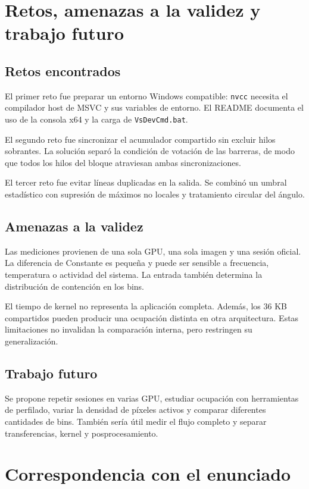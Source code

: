 \documentclass[12pt,letterpaper]{article}
\begin{document}
\section{Retos, amenazas a la validez y trabajo futuro}

\subsection{Retos encontrados}

El primer reto fue preparar un entorno Windows compatible: \texttt{nvcc} necesita el compilador host de MSVC y sus variables de entorno. El README documenta el uso de la consola x64 y la carga de \texttt{VsDevCmd.bat}.

El segundo reto fue sincronizar el acumulador compartido sin excluir hilos sobrantes. La solución separó la condición de votación de las barreras, de modo que todos los hilos del bloque atraviesan ambas sincronizaciones.

El tercer reto fue evitar líneas duplicadas en la salida. Se combinó un umbral estadístico con supresión de máximos no locales y tratamiento circular del ángulo.

\subsection{Amenazas a la validez}

Las mediciones provienen de una sola GPU, una sola imagen y una sesión oficial. La diferencia de Constante es pequeña y puede ser sensible a frecuencia, temperatura o actividad del sistema. La entrada también determina la distribución de contención en los bins.

El tiempo de kernel no representa la aplicación completa. Además, los 36 KB compartidos pueden producir una ocupación distinta en otra arquitectura. Estas limitaciones no invalidan la comparación interna, pero restringen su generalización.

\subsection{Trabajo futuro}

Se propone repetir sesiones en varias GPU, estudiar ocupación con herramientas de perfilado, variar la densidad de píxeles activos y comparar diferentes cantidades de bins. También sería útil medir el flujo completo y separar transferencias, kernel y posprocesamiento.

\section{Correspondencia con el enunciado}
\end{document}
